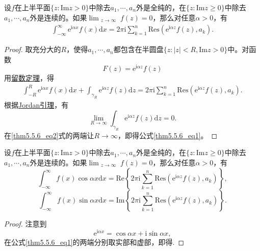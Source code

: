 \documentclass[../../main.tex]{subfiles}%
\begin{document}
\begin{theorem}\label{theorem:定理5.5.6}
设$f$在上半平面$\{ z: \mathrm{Im} z > 0 \}$中除去$a_1, \cdots, a_n$外是全纯的，在$\{ z: \mathrm{Im} z \geqslant 0 \}$中除去$a_1, \cdots, a_n$外是连续的。如果$\lim_{\substack{z \to \infty}} f(z) = 0$，那么对任意$\alpha > 0$，有
\begin{align}
\int_{-\infty}^{\infty} \mathrm{e}^{\mathrm{i}\alpha x} f(x) \mathrm{d}x = 2\pi \mathrm{i} \sum_{k=1}^{n} \mathrm{Res}(\mathrm{e}^{\mathrm{i}\alpha z} f(z), a_k). \label{thm5.5.6_eq1}
\end{align}
\end{theorem}
\begin{proof}

取充分大的$R$，使得$a_1, \cdots, a_n$都包含在半圆盘$\{ z: |z| < R, \mathrm{Im} z > 0 \}$中。对函数
\[
F(z) = \mathrm{e}^{\mathrm{i}\alpha z} f(z)
\]
用\hyperref[theorem:留数定理(残数定理)-定理5.4.9]{留数定理}，得
\begin{align}
\int_{-R}^{R} \mathrm{e}^{\mathrm{i}\alpha x} f(x) \mathrm{d}x + \int_{\gamma_R} \mathrm{e}^{\mathrm{i}\alpha z} f(z) \mathrm{d}z = 2\pi \mathrm{i} \sum_{k=1}^{n} \mathrm{Res}(\mathrm{e}^{\mathrm{i}\alpha z} f(z), a_k). \label{thm5.5.6_eq2}
\end{align}
根据\hyperref[lemma:Jordan引理]{Jordan引理}，有
\[
\lim_{R \to \infty} \int_{\gamma_R} \mathrm{e}^{\mathrm{i}\alpha z} f(z) \mathrm{d}z = 0.
\]
在\eqref{thm5.5.6_eq2}式的两端让$R \to \infty$，即得公式\eqref{thm5.5.6_eq1}。

\end{proof}

\begin{corollary}\label{corollary:推论5.5.7}
设$f$在上半平面$\{ z: \mathrm{Im} z > 0 \}$中除去$a_1, \cdots, a_n$外是全纯的，在$\{ z: \mathrm{Im} z \geqslant 0 \}$中除去$a_1, \cdots, a_n$外是连续的。如果$\lim_{\substack{z \to \infty}} f(z) = 0$，那么对任意$\alpha > 0$，有
\[
\int_{-\infty}^{\infty} f(x) \cos\alpha x \mathrm{d}x = \mathrm{Re} \left\{ 2\pi \mathrm{i} \sum_{k=1}^{n} \mathrm{Res}(\mathrm{e}^{\mathrm{i}\alpha z} f(z), a_k) \right\},
\]
\[
\int_{-\infty}^{\infty} f(x) \sin\alpha x \mathrm{d}x = \mathrm{Im} \left\{ 2\pi \mathrm{i} \sum_{k=1}^{n} \mathrm{Res}(\mathrm{e}^{\mathrm{i}\alpha z} f(z), a_k) \right\}.
\]
\end{corollary}
\begin{proof}

注意到
\[
\mathrm{e}^{\mathrm{i}\alpha x} = \cos\alpha x + \mathrm{i}\sin\alpha x,
\]
在公式\eqref{thm5.5.6_eq1}的两端分别取实部和虚部，即得.

\end{proof}
\end{document}
